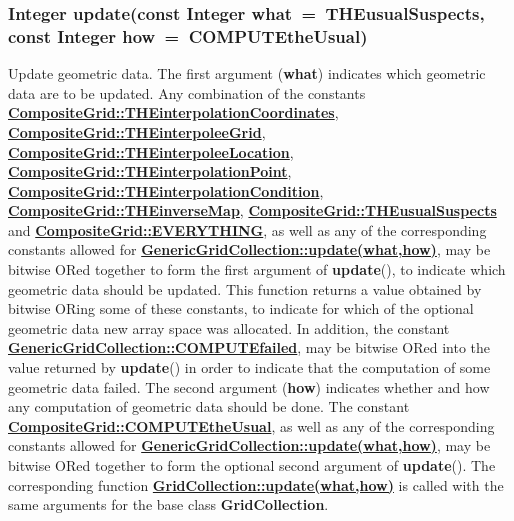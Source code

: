 \documentclass{article}
\begin{document}
  \subsubsection{Integer update(const Integer what~=~THEusualSuspects,  const Integer how~=~COMPUTEtheUsual)}
  \label{CompositeGrid::update(what,how)}
    Update geometric data.
    The first argument (\textbf{what}) indicates which geometric data are to be updated.  Any combination of the constants
    {\bf{}\hyperref{THEinterpolationCoordinates}{THEinterpolationCoordinates \rm(\S}{)}{CompositeGrid::THEinterpolationCoordinates}},
    {\bf{}\hyperref{THEinterpoleeGrid}{THEinterpoleeGrid \rm(\S}{)}{CompositeGrid::THEinterpoleeGrid}},
    {\bf{}\hyperref{THEinterpoleeLocation}{THEinterpoleeLocation \rm(\S}{)}{CompositeGrid::THEinterpoleeLocation}},
    {\bf{}\hyperref{THEinterpolationPoint}{THEinterpolationPoint \rm(\S}{)}{CompositeGrid::THEinterpolationPoint}},
    {\bf{}\hyperref{THEinterpolationCondition}{THEinterpolationCondition \rm(\S}{)}{CompositeGrid::THEinterpolationCondition}},
    {\bf{}\hyperref{THEinverseMap}{THEinverseMap \rm(\S}{)}{CompositeGrid::THEinverseMap}},
    {\bf{}\hyperref{THEusualSuspects}{THEusualSuspects \rm(\S}{)}{CompositeGrid::THEusualSuspects}} and
    {\bf{}\hyperref{EVERYTHING}{EVERYTHING \rm(\S}{)}{CompositeGrid::EVERYTHING}},
    as well as any of the corresponding constants allowed for
    {\bf{}\hyperref{GridCollection::update(what,how)}{GenericGridCollection::update(what,how) \rm(\S}{)}{GenericGridCollection::update(what,how)}},
    may be bitwise ORed together to form the first argument of \textbf{update}(),
    to indicate which geometric data should be updated.
    This function returns a value obtained by bitwise ORing some of these constants,
    to indicate for which of the optional geometric data new array space was allocated.
    In addition, the constant
    {\bf{}\hyperref{COMPUTEfailed}{COMPUTEfailed \rm(\S}{)}{GenericGridCollection::COMPUTEfailed}},
    may be bitwise ORed into the value returned by \textbf{update}() in order to indicate
    that the computation of some geometric data failed.  The second argument (\textbf{how})
    indicates whether and how any computation of geometric data should be done.
    The constant {\bf{}\hyperref{COMPUTEtheUsual}{COMPUTEtheUsual \rm(\S}{)}{CompositeGrid::COMPUTEtheUsual}},
    as well as any of the corresponding constants allowed for
    {\bf{}\hyperref{GridCollection::update(what,how)}{GenericGridCollection::update(what,how) \rm(\S}{)}{GenericGridCollection::update(what,how)}},
    may be bitwise ORed together to form the optional second argument of \textbf{update}().
    The corresponding function
    {\bf{}\hyperref{update(what,how)}{update(what,how) \rm(\S}{)}{GridCollection::update(what,how)}}
    is called with the same arguments for the base class \textbf{GridCollection}.
\end{document}
